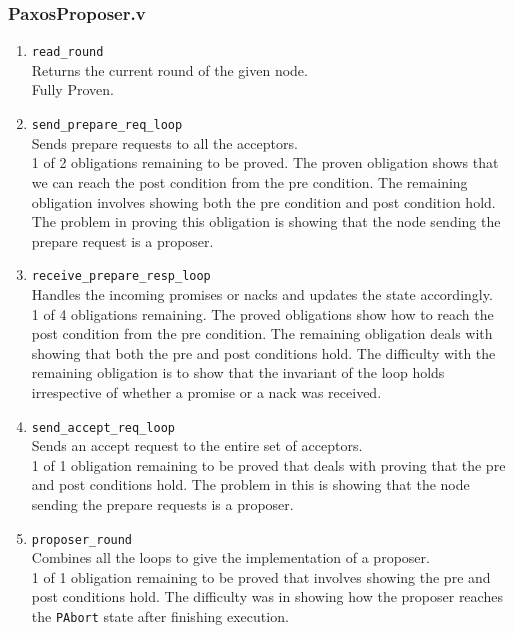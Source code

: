 \subsubsection{PaxosProposer.v}
\begin{enumerate}
  \item \texttt{read\_round} \\
    Returns the current round of the given node. \\
    Fully Proven.
  \item \texttt{send\_prepare\_req\_loop} \\
    Sends prepare requests to all the acceptors. \\
    1 of 2 obligations remaining to be proved. The proven obligation shows that we
    can reach the post condition from the pre condition. The remaining obligation
    involves showing both the pre condition and post condition hold.
    The problem in proving this obligation is showing that the node sending the
    prepare request is a proposer.
  \item \texttt{receive\_prepare\_resp\_loop} \\
    Handles the incoming promises or nacks and updates the state accordingly. \\
    1 of 4 obligations remaining.
    The proved obligations show how to reach the post
    condition from the pre condition.
    The remaining obligation deals with showing that both the pre and post conditions
    hold. The difficulty with the remaining obligation is
    to show that the invariant of the loop holds
    irrespective of whether a promise or a nack was received.
  \item \texttt{send\_accept\_req\_loop} \\
    Sends an accept request to the entire set of acceptors. \\
    1 of 1 obligation remaining to be proved that deals with proving that the
    pre and post conditions hold. The problem in this is showing that
    the node sending the prepare requests is a proposer.
  \item \texttt{proposer\_round} \\
    Combines all the loops to give the implementation of a proposer. \\
    1 of 1 obligation remaining to be proved that involves showing the pre and post
    conditions hold. The difficulty was in showing how
    the proposer reaches the \texttt{PAbort} state after finishing execution.
\end{enumerate}

